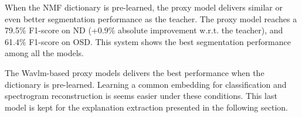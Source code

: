 When the NMF dictionary is pre-learned, the proxy model delivers similar or even better segmentation performance as the teacher.
The proxy model reaches a 79.5\% F1-score on ND (+0.9\% absolute improvement w.r.t. the teacher), and 61.4\% F1-score on OSD.
This system shows the best segmentation performance among all the models.

The Wavlm-based proxy models delivers the best performance when the dictionary is pre-learned.
Learning a common embedding for classification and spectrogram reconstruction is seems easier under these conditions.
This last model is kept for the explanation extraction presented in the following section.
